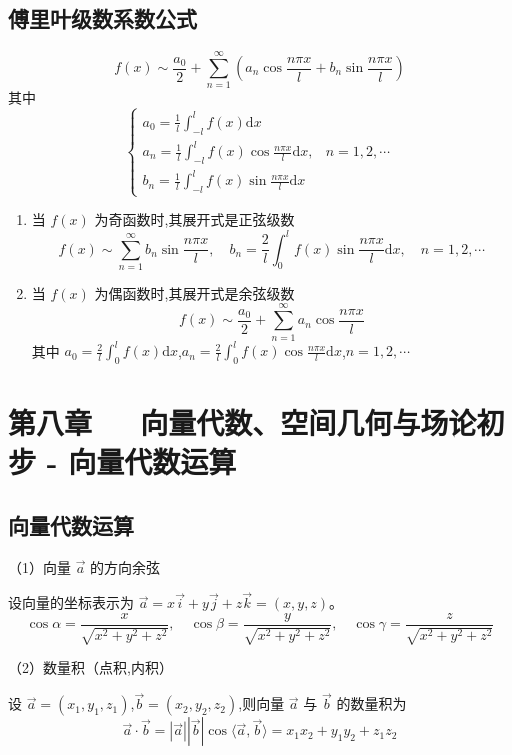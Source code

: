 \documentclass[UTF8]{ctexart}
\theoremstyle{remark}
\begin{document}
		\subsection{傅里叶级数系数公式}
		\[
		f(x)\sim\frac{a_0}{2}+\sum_{n = 1}^{\infty}\left(a_n\cos\frac{n\pi x}{l}+b_n\sin\frac{n\pi x}{l}\right)
		\]
		其中
		\[
		\begin{cases}
			a_0=\frac{1}{l}\int_{-l}^{l}f(x)\mathrm{d}x\\
			a_n=\frac{1}{l}\int_{-l}^{l}f(x)\cos\frac{n\pi x}{l}\mathrm{d}x, & n = 1, 2, \cdots\\
			b_n=\frac{1}{l}\int_{-l}^{l}f(x)\sin\frac{n\pi x}{l}\mathrm{d}x
		\end{cases}
		\]
		\begin{enumerate}
			\item 当 \(f(x)\) 为奇函数时,其展开式是正弦级数
			\[
			f(x)\sim\sum_{n = 1}^{\infty}b_n\sin\frac{n\pi x}{l}, \quad b_n=\frac{2}{l}\int_{0}^{l}f(x)\sin\frac{n\pi x}{l}\mathrm{d}x, \quad n = 1, 2, \cdots
			\]
			\item 当 \(f(x)\) 为偶函数时,其展开式是余弦级数
			\[
			f(x)\sim\frac{a_0}{2}+\sum_{n = 1}^{\infty}a_n\cos\frac{n\pi x}{l}
			\]
			其中 \(a_0=\frac{2}{l}\int_{0}^{l}f(x)\mathrm{d}x\),\(a_n=\frac{2}{l}\int_{0}^{l}f(x)\cos\frac{n\pi x}{l}\mathrm{d}x\),\(n = 1, 2, \cdots\)
		\end{enumerate}
		
		\section{第八章~~~向量代数、空间几何与场论初步 - 向量代数运算}
			
			\subsection{向量代数运算}
			（1）向量 \(\vec{a}\) 的方向余弦
			
			设向量的坐标表示为 \(\vec{a}=x\vec{i}+y\vec{j}+z\vec{k}=(x,y,z)\)。
			\[
			\cos\alpha=\frac{x}{\sqrt{x^{2}+y^{2}+z^{2}}}, \quad \cos\beta=\frac{y}{\sqrt{x^{2}+y^{2}+z^{2}}}, \quad \cos\gamma=\frac{z}{\sqrt{x^{2}+y^{2}+z^{2}}}
			\]
			
			（2）数量积（点积,内积）
			
			设 \(\vec{a}=(x_1,y_1,z_1)\),\(\vec{b}=(x_2,y_2,z_2)\),则向量 \(\vec{a}\) 与 \(\vec{b}\) 的数量积为
			\[
			\vec{a}\cdot\vec{b}=|\vec{a}||\vec{b}|\cos\langle\vec{a},\vec{b}\rangle=x_1x_2 + y_1y_2 + z_1z_2
			\]
			
\end{document}
